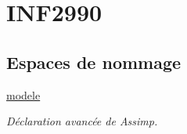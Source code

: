 \hypertarget{group__inf2990}{\section{I\-N\-F2990}
\label{group__inf2990}
}
\subsection*{Espaces de nommage}
\begin{DoxyCompactItemize}
\item 
\hyperlink{namespacemodele}{modele}
\begin{DoxyCompactList}\small\item\em Déclaration avancée de Assimp. \end{DoxyCompactList}\end{DoxyCompactItemize}
